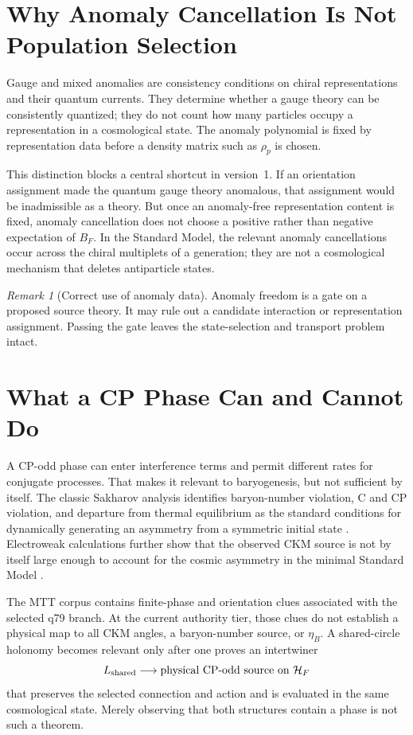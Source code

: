 \documentclass[11pt]{article}
\theoremstyle{definition}
\theoremstyle{remark}
\newtheorem{remark}{Remark}
\begin{document}
\section{Why Anomaly Cancellation Is Not Population Selection}

Gauge and mixed anomalies are consistency conditions on chiral
representations and their quantum currents.  They determine whether a gauge
theory can be consistently quantized; they do not count how many particles
occupy a representation in a cosmological state.  The anomaly polynomial is
fixed by representation data before a density matrix such as $\rho_p$ is
chosen.

This distinction blocks a central shortcut in version~1.  If an orientation
assignment made the quantum gauge theory anomalous, that assignment would be
inadmissible as a theory.  But once an anomaly-free representation content is
fixed, anomaly cancellation does not choose a positive rather than negative
expectation of $B_F$.  In the Standard Model, the relevant anomaly
cancellations occur across the chiral multiplets of a generation; they are
not a cosmological mechanism that deletes antiparticle states.

\begin{remark}[Correct use of anomaly data]
Anomaly freedom is a gate on a proposed source theory.  It may rule out a
candidate interaction or representation assignment.  Passing the gate leaves
the state-selection and transport problem intact.
\end{remark}

\section{What a CP Phase Can and Cannot Do}

A CP-odd phase can enter interference terms and permit different rates for
conjugate processes.  That makes it relevant to baryogenesis, but not
sufficient by itself.  The classic Sakharov analysis identifies
baryon-number violation, C and CP violation, and departure from thermal
equilibrium as the standard conditions for dynamically generating an
asymmetry from a symmetric initial state \cite{Sakharov1967}.  Electroweak
calculations further show that the observed CKM source is not by itself large
enough to account for the cosmic asymmetry in the minimal Standard Model
\cite{HuetSather1995}.

The MTT corpus contains finite-phase and orientation clues associated with the
selected q79 branch.  At the current authority tier, those clues do not
establish a physical map to all CKM angles, a baryon-number source, or
$\eta_B$.  A shared-circle holonomy becomes relevant only after one proves an
intertwiner
\[
 L_{\rm shared}
 \longrightarrow
 \text{physical CP-odd source on }\mathcal H_F
\]
that preserves the selected connection and action and is evaluated in the
same cosmological state.  Merely observing that both structures contain a
phase is not such a theorem.
\end{document}
